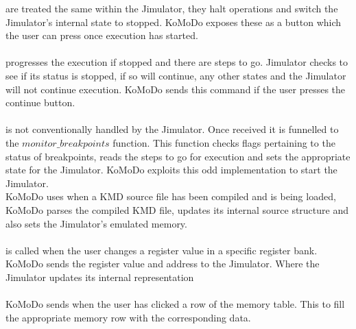 %
 are treated the same within the Jimulator, they halt operations and switch the Jimulator's internal state to stopped. KoMoDo exposes these as a button which the user can press once execution has started.\\\\
%
 progresses the execution if stopped and there are steps to go. Jimulator checks to see if its status is stopped, if so will continue, any other states and the Jimulator will not continue execution. KoMoDo sends this command if the user presses the continue button.\\\\
%
 is not conventionally handled by the Jimulator. Once received it is funnelled to the $monitor\_breakpoints$ function. This function checks flags pertaining to the status of breakpoints, reads the steps to go for execution and sets the appropriate state for the Jimulator. KoMoDo exploits this odd implementation to start the Jimulator.\\
%
%
%
%
KoMoDo uses  when a KMD source file has been compiled and is being loaded, KoMoDo parses the compiled KMD file, updates its internal source structure and also sets the Jimulator's emulated memory.\\\\
%
 is called when the user changes a register value in a specific register bank. KoMoDo sends the register value and address to the Jimulator. Where the Jimulator updates its internal representation\\\\
%
KoMoDo sends  when the user has clicked a row of the memory table. This to fill the appropriate memory row with the corresponding data.\\\\
